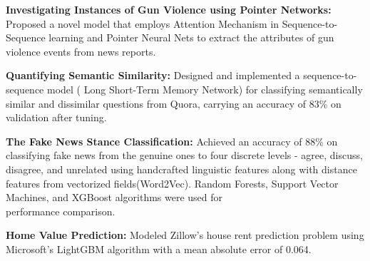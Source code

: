 \begin{cventries}
\vspace{-5mm}
  \cventry
    {}
    {}
    {}
    {}
    {
      \begin{cvitems}
      \item {{ \textbf{Investigating Instances of Gun Violence using Pointer Networks:} Proposed a novel model that employs Attention Mechanism in Sequence-to-Sequence learning and Pointer Neural Nets to extract the attributes of gun violence events from news reports.}}
      \item {{ \textbf{Quantifying Semantic Similarity:} Designed and implemented a sequence-to-sequence model ( Long Short-Term Memory Network) for classifying semantically similar and dissimilar questions from Quora, carrying an accuracy of 83\% on validation after tuning.}}
      \item { \textbf{The Fake News Stance Classification:} Achieved an accuracy of 88\% on classifying fake news from the genuine ones to four discrete levels - agree, discuss, disagree, and unrelated using handcrafted linguistic features along with distance features from vectorized fields(Word2Vec). Random Forests, Support Vector Machines, and XGBoost algorithms were used for \\ performance comparison.}
      \item { \textbf{Home Value Prediction:} Modeled Zillow's house rent prediction problem using Microsoft's LightGBM algorithm with a mean absolute error of 0.064.}
      \end{cvitems}
    }
\end{cventries}
